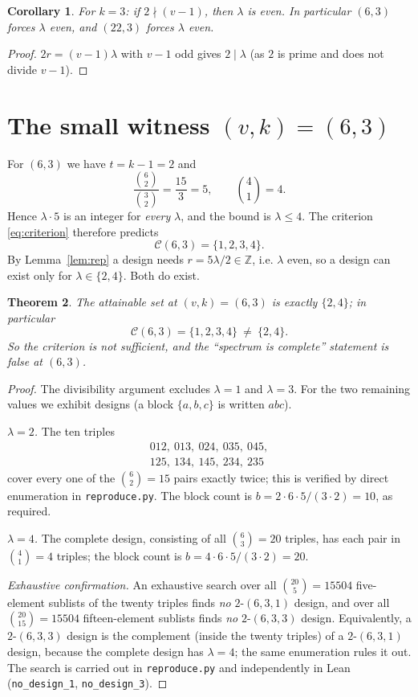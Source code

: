 \documentclass[11pt]{article}
\newtheorem{theorem}{Theorem}
\newtheorem{corollary}[theorem]{Corollary}
\theoremstyle{definition}
\theoremstyle{remark}
\begin{document}
\begin{corollary}\label{cor:parity}
For $k=3$: if $2\nmid (v-1)$, then $\lambda$ is even. In particular
$(6,3)$ forces $\lambda$ even, and $(22,3)$ forces $\lambda$ even.
\end{corollary}

\begin{proof}
$2r=(v-1)\lambda$ with $v-1$ odd gives $2\mid\lambda$ (as $2$
is prime and does not divide $v-1$).
\end{proof}

\section{The small witness $(v,k)=(6,3)$}

For $(6,3)$ we have $t=k-1=2$ and
\[
\frac{\binom{6}{2}}{\binom{3}{2}}=\frac{15}{3}=5,\qquad
\binom{4}{1}=4 .
\]
Hence $\lambda\cdot 5$ is an integer for \emph{every} $\lambda$, and the bound
is $\lambda\le 4$. The criterion \eqref{eq:criterion} therefore predicts
\[
\mathcal C(6,3)=\{1,2,3,4\}.
\]
By Lemma~\ref{lem:rep} a design needs $r=5\lambda/2\in\mathbb Z$, i.e.
$\lambda$ even, so a design can exist only for $\lambda\in\{2,4\}$. Both do
exist.

\begin{theorem}\label{thm:sixthree}
The attainable set at $(v,k)=(6,3)$ is exactly $\{2,4\}$; in particular
\[
\mathcal C(6,3)=\{1,2,3,4\}\ \neq\ \{2,4\}.
\]
So the criterion is not sufficient, and the ``spectrum is complete'' statement
is false at $(6,3)$.
\end{theorem}

\begin{proof}
The divisibility argument excludes $\lambda=1$ and $\lambda=3$. For the two
remaining values we exhibit designs (a block $\{a,b,c\}$ is written $abc$).

\emph{$\lambda=2$.} The ten triples
\[
\begin{gathered}
012,\ 013,\ 024,\ 035,\ 045,\\
125,\ 134,\ 145,\ 234,\ 235
\end{gathered}
\]
cover every one of the $\binom{6}{2}=15$ pairs exactly twice; this is verified
by direct enumeration in \texttt{reproduce.py}. The block count is
$b=2\cdot 6\cdot 5/(3\cdot 2)=10$, as required.

\emph{$\lambda=4$.} The complete design, consisting of all $\binom{6}{3}=20$
triples, has each pair in $\binom{4}{1}=4$ triples; the block count is
$b=4\cdot 6\cdot 5/(3\cdot 2)=20$.

\emph{Exhaustive confirmation.} An exhaustive search over all $\binom{20}{5}=
15504$ five-element sublists of the twenty triples finds \emph{no}
$2$-$(6,3,1)$ design, and over all $\binom{20}{15}=15504$ fifteen-element
sublists finds \emph{no} $2$-$(6,3,3)$ design. Equivalently, a
$2$-$(6,3,3)$ design is the complement (inside the twenty triples) of a
$2$-$(6,3,1)$ design, because the complete design has $\lambda=4$; the same
enumeration rules it out. The search is carried out in \texttt{reproduce.py}
and independently in Lean (\texttt{no\_design\_1}, \texttt{no\_design\_3}).
\end{proof}
\end{document}
